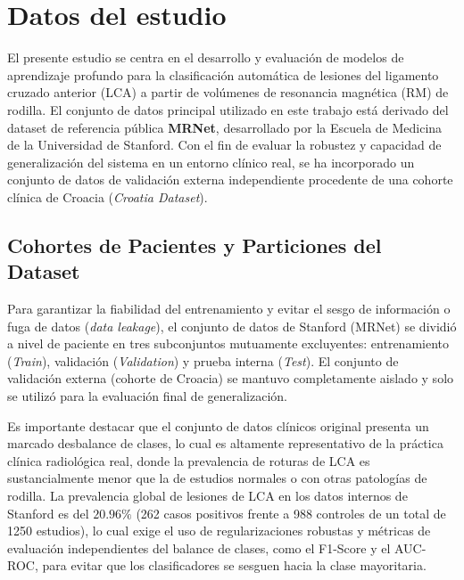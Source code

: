 
\section{Datos del estudio}
\label{sec:datos_estudio}

El presente estudio se centra en el desarrollo y evaluación de modelos de aprendizaje profundo para la clasificación automática de lesiones del ligamento cruzado anterior (LCA) a partir de volúmenes de resonancia magnética (RM) de rodilla. El conjunto de datos principal utilizado en este trabajo está derivado del dataset de referencia pública \textbf{MRNet}, desarrollado por la Escuela de Medicina de la Universidad de Stanford. Con el fin de evaluar la robustez y capacidad de generalización del sistema en un entorno clínico real, se ha incorporado un conjunto de datos de validación externa independiente procedente de una cohorte clínica de Croacia (\textit{Croatia Dataset}).


\subsection{Cohortes de Pacientes y Particiones del Dataset}
Para garantizar la fiabilidad del entrenamiento y evitar el sesgo de información o fuga de datos (\textit{data leakage}), el conjunto de datos de Stanford (MRNet) se dividió a nivel de paciente en tres subconjuntos mutuamente excluyentes: entrenamiento (\textit{Train}), validación (\textit{Validation}) y prueba interna (\textit{Test}). El conjunto de validación externa (cohorte de Croacia) se mantuvo completamente aislado y solo se utilizó para la evaluación final de generalización.

Es importante destacar que el conjunto de datos clínicos original presenta un marcado desbalance de clases, lo cual es altamente representativo de la práctica clínica radiológica real, donde la prevalencia de roturas de LCA es sustancialmente menor que la de estudios normales o con otras patologías de rodilla. La prevalencia global de lesiones de LCA en los datos internos de Stanford es del $20.96\%$ (262 casos positivos frente a 988 controles de un total de 1250 estudios), lo cual exige el uso de regularizaciones robustas y métricas de evaluación independientes del balance de clases, como el F1-Score y el AUC-ROC, para evitar que los clasificadores se sesguen hacia la clase mayoritaria.

